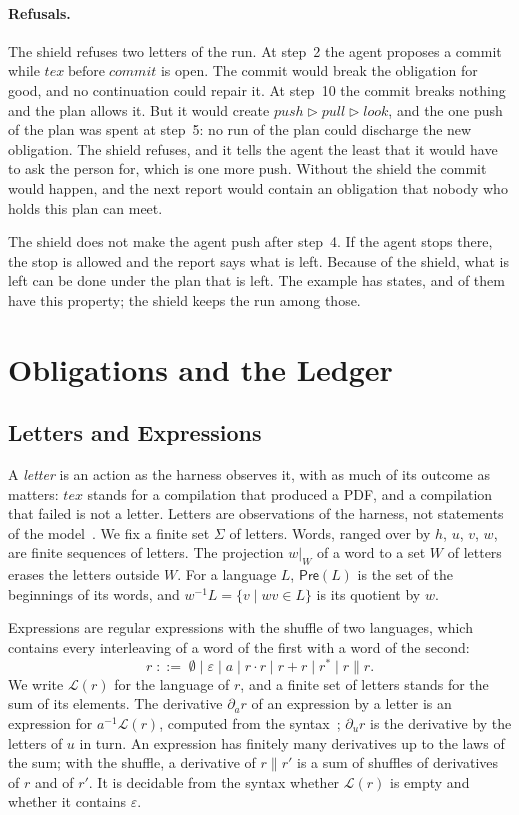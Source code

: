 \documentclass[acmsmall,nonacm,screen]{acmart}
\newcommand{\kw}[1]{\mathsf{#1}}
\newcommand{\nm}[1]{\mathit{#1}}
\newcommand{\lang}[1]{\mathcal{L}(#1)}
\newcommand{\pre}[1]{\kw{Pre}(#1)}
\newcommand{\later}{\mathbin{\triangleright}}
\newcommand{\bef}{\mathrel{\text{before}}}
\newcommand{\sh}{\mathbin{\parallel}}
\newcommand{\dv}[2]{\partial_{#1}#2}
\newcommand{\proj}[2]{#1|_{#2}}
\newcommand{\tex}{\nm{tex}}
\newcommand{\commit}{\nm{commit}}
\newcommand{\push}{\nm{push}}
\newcommand{\pull}{\nm{pull}}
\newcommand{\look}{\nm{look}}
\newcommand{\claim}[2]{#2}
\begin{document}
\paragraph{Refusals.} \claim{walk-refusals}{The shield refuses two letters of the run.} At
step~2 the agent proposes a commit while $\tex \bef \commit$ is open. The commit would break
the obligation for good, and no continuation could repair it. At step~10 the commit breaks
nothing and the plan allows it. But it would create $\push \later \pull \later \look$, and
the one push of the plan was spent at step~5: no run of the plan could discharge the new
obligation. The shield refuses, and it tells the agent the least that it would have to ask
the person for, which is one more push. Without the shield the commit would happen, and the
next report would contain an obligation that nobody who holds this plan can meet.

The shield does not make the agent push after step~4. If the agent stops there, the stop is
allowed and the report says what is left. Because of the shield, what is left can be done
under the plan that is left. The example has \exExampleStates{} states, and
\exExampleCovered{} of them have this property; the shield keeps the run among those.

\section{Obligations and the Ledger}
\label{sec:ledger}

\subsection{Letters and Expressions}

A \emph{letter} is an action as the harness observes it, with as much of its outcome as
matters: $\tex$ stands for a compilation that produced a PDF, and a compilation that failed
is not a letter. Letters are observations of the harness, not statements of the
model~\cite{tpp10}. We fix a finite set $\Sigma$ of letters. Words, ranged over by $h$, $u$,
$v$, $w$, are finite sequences of letters. The projection $\proj{w}{W}$ of a word to a set
$W$ of letters erases the letters outside $W$. For a language $L$, $\pre{L}$ is the set of
the beginnings of its words, and $w^{-1}L = \{v \mid wv \in L\}$ is its quotient by $w$.

Expressions are regular expressions with the shuffle of two languages, which contains every
interleaving of a word of the first with a word of the second:
\[
  r \;::=\; \emptyset \mid \varepsilon \mid a \mid r \cdot r \mid r + r \mid r^{*} \mid r \sh r .
\]
We write $\lang{r}$ for the language of $r$, and a finite set of letters stands for the sum
of its elements. The derivative $\dv{a}{r}$ of an expression by a letter is an expression
for $a^{-1}\lang{r}$, computed from the syntax~\cite{brzozowski1964}; $\dv{u}{r}$ is the
derivative by the letters of $u$ in turn. An expression has finitely many derivatives up to
the laws of the sum; with the shuffle, a derivative of $r \sh r'$ is a sum of shuffles of
derivatives of $r$ and of $r'$. It is decidable from the syntax whether
$\lang{r}$ is empty and whether it contains $\varepsilon$.
\end{document}
